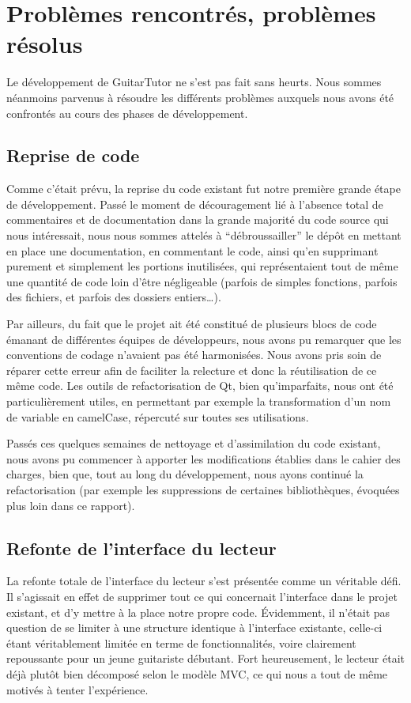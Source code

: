 \section{Problèmes rencontrés, problèmes résolus}

Le développement de GuitarTutor ne s'est pas fait sans heurts. Nous sommes néanmoins parvenus à résoudre les différents problèmes auxquels nous avons été confrontés au cours des phases de développement.

\subsection{Reprise de code}

Comme c'était prévu, la reprise du code existant fut notre première grande étape de développement. Passé le moment de découragement lié à l'absence total de commentaires et de documentation dans la grande majorité du code source qui nous intéressait, nous nous sommes attelés à ``débroussailler'' le dépôt en mettant en place une documentation, en commentant le code, ainsi qu'en supprimant purement et simplement les portions inutilisées, qui représentaient tout de même une quantité de code loin d'être négligeable (parfois de simples fonctions, parfois des fichiers, et parfois des dossiers entiers\dots).

Par ailleurs, du fait que le projet ait été constitué de plusieurs blocs de code émanant de différentes équipes de développeurs, nous avons pu remarquer que les conventions de codage n'avaient pas été harmonisées. Nous avons pris soin de réparer cette erreur afin de faciliter la relecture et donc la réutilisation de ce même code. Les outils de refactorisation de Qt, bien qu'imparfaits, nous ont été particulièrement
utiles, en permettant par exemple la transformation d'un nom de variable en camelCase, répercuté sur toutes ses utilisations.

Passés ces quelques semaines de nettoyage et d'assimilation du code existant, nous avons pu commencer à apporter les modifications établies dans le cahier des charges, bien que, tout au long du développement, nous ayons continué la refactorisation (par exemple les suppressions de certaines bibliothèques, évoquées plus loin dans ce rapport).

\subsection{Refonte de l'interface du lecteur}

La refonte totale de l'interface du lecteur s'est présentée comme un véritable défi. Il s'agissait en effet de supprimer tout ce qui concernait l'interface dans le projet existant, et d'y mettre à la place notre propre code. Évidemment, il n'était pas question de se limiter à une structure identique à l'interface existante, celle-ci étant véritablement limitée en terme de fonctionnalités, voire clairement repoussante pour un jeune guitariste débutant. Fort heureusement, le lecteur était déjà plut\^ot bien décomposé selon le modèle MVC, ce qui nous a tout de m\^eme motivés à tenter l'expérience.

